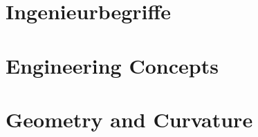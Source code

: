 \documentclass[11pt,a4paper,oneside,openany]{scrbook}
\newif\ifaimGerman
\theoremstyle{plain}
\theoremstyle{definition}
\theoremstyle{remark}
\begin{document}
\part{Ingenieurbegriffe}
\else
\part{Engineering Concepts}
\fi

\ifaimGerman
  
\else
  
\fi


\ifaimGerman
  
  
  
\else
  
  
  
\fi


\ifaimGerman
  
  
  
\else
  
  
  
\fi


\ifaimGerman
  
\else
  
\fi

\ifaimGerman
  \part{Geometrie und Krümmung}
\else
  \part{Geometry and Curvature}
\fi

\ifaimGerman
  
\else
  
\fi
\end{document}
